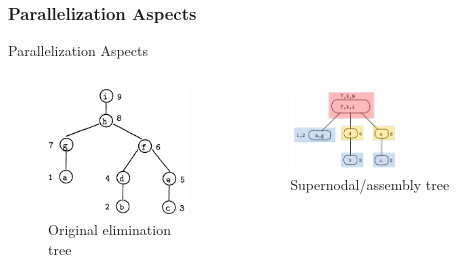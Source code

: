 \subsubsection{Parallelization Aspects}


\begin{frame}[t]{Parallelization Aspects}
\small

\vspace{-5mm}
\begin{columns}
	\begin{column}{0.5\textwidth}
		\begin{figure}
			\centering
			\includegraphics[width=0.3\textheight]{figures/chapter-2/elimination-tree-mm.png}
			\caption{Original elimination tree}
		\end{figure}
	\end{column}
	
	\begin{column}{0.5\textwidth}
		\begin{figure}
			\centering
			\includegraphics[width=0.6\textwidth]{figures/chapter-2/elimination-tree-parallel.png}
			\caption{Supernodal/assembly tree}
		\end{figure}
	\end{column}
	

\end{columns}
\end{frame}
